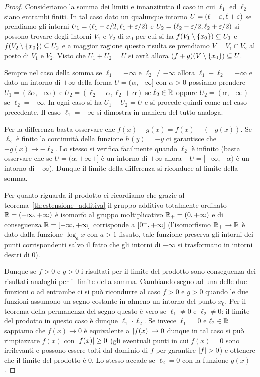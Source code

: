 \begin{proof}
Consideriamo la somma dei limiti
e innanzitutto il caso in cui $\ell_1$ ed $\ell_2$ 
siano entrambi finiti. 
In tal caso dato un qualunque intorno $U=(\ell-\varepsilon,\ell+\varepsilon)$ 
se prendiamo gli intorni $U_1=(\ell_1-\varepsilon/2,\ell_1+\varepsilon/2)$ 
e $U_2 = (\ell_2-\varepsilon/2,\ell_2+\varepsilon/2)$ si possono trovare 
degli intorni $V_1$ e $V_2$ di $x_0$ per cui si ha 
$f(V_1\setminus{\left\{ x_0 \right\}}) \subseteq U_1$ e 
$f(V_2\setminus {\left\{ x_0 \right\}}) \subseteq U_2$
e a maggior ragione questo risulta se prendiamo $V=V_1\cap V_2$ 
al posto di $V_1$ e $V_2$. 
Visto che $U_1+U_2 = U$ si avrà allora 
$(f+g)(V\setminus{\left\{ x_0 \right\}})\subseteq U$.

Sempre nel caso della somma 
se $\ell_1=+\infty$ e $\ell_2\neq -\infty$
allora $\ell_1+\ell_2=+\infty$ e 
dato un intorno di $+\infty$ 
della forma $U=(\alpha,+\infty]$ con $\alpha>0$
possiamo prendere 
$U_1 = (2\alpha,+\infty)$ e $U_2 = (\ell_2-\alpha,\ell_2+\alpha)$ 
se $\ell_2\in \mathbb R$ oppure $U_2 = (\alpha,+\infty)$ se $\ell_2=+\infty$.
In ogni caso si ha $U_1+U_2 = U$ e si procede quindi come nel caso precedente.
Il caso $\ell_1=-\infty$ si dimostra in maniera del tutto analoga.

Per la differenza basta osservare che $f(x)-g(x) = f(x) + (-g(x))$.
Se $\ell_2$ è finito la continuità della funzione $h(y)=-y$
ci garantisce che $-g(x)\to -\ell_2$.
Lo stesso si verifica facilmente quando $\ell_2$ è infinito 
(basta osservare che se $U=(\alpha,+\infty+]$ è un intorno di $+\infty$
allora $-U = [-\infty,-\alpha)$ è un intorno di $-\infty$). 
Dunque il limite della differenza si riconduce al limite della somma.

Per quanto riguarda il prodotto ci ricordiamo che grazie 
al teorema~\ref{th:estensione_additiva} il gruppo additivo totalmente 
ordinato $\mathbb R = \left(-\infty,+\infty\right)$ 
è isomorfo al gruppo moltiplicativo $\mathbb R_+ = \left(0,+\infty\right)$
e di conseguenza $\bar {\mathbb R} = \left[-\infty,+\infty\right]$
corrisponde a $\left[0^+,+\infty\right]$
(l'isomorfismo $\mathbb R_+\to \mathbb R$ è dato dalla funzione $\log_a x$ con $a>1$ 
fissato,
tale funzione preserva gli intorni dei punti corrispondenti salvo il fatto 
che gli intorni di $-\infty$ si trasformano in intorni destri di $0$).

Dunque se $f > 0$ e $g > 0$ i risultati per il limite del prodotto 
sono conseguenza dei risultati analoghi per il limite della somma.
Cambiando segno ad una delle due funzioni o ad entrambe ci si può 
ricondurre al caso $f > 0$ e $g > 0$ quando le due funzioni assumono 
un segno costante in almeno un intorno del punto $x_0$.
Per il teorema della permanenza del segno questo è vero se 
$\ell_1\neq 0$ e $\ell_2\neq 0$: il limite del prodotto in questo caso 
è dunque $\ell_1\cdot \ell_2$.
Se invece $\ell_1=0$ e $\ell_2\in\mathbb R$ sappiamo che $f(x)\to 0$ 
è equivalente a ${\left|f(x)\right|}\to 0$ dunque in tal caso si può rimpiazzare $f(x)$ con ${\left|f(x)\right|}\ge 0$
(gli eventuali punti in cui $f(x)=0$ sono irrilevanti e possono essere tolti 
dal dominio di $f$ per garantire ${\left|f\right|}>0$) e ottenere che il limite 
del prodotto è $0$.
Lo stesso accade se $\ell_2=0$ con la funzione $g(x)$.


\end{proof}
